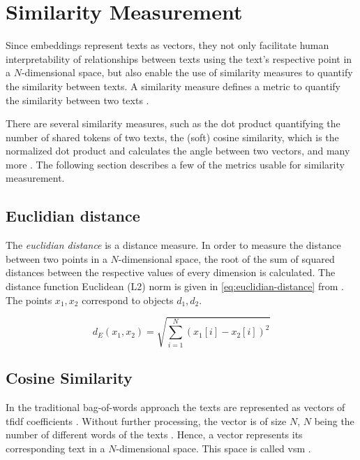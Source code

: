 
\section{Similarity Measurement}\label{sec:similarity-measurement}

Since embeddings represent texts as vectors, they not only facilitate human interpretability of relationships between texts using 
the text's respective point in a $N$-dimensional space, but also enable the use of similarity measures to quantify the similarity between texts.
A similarity measure defines a metric to quantify the similarity between two texts \cite{IR2011, euclidean_l2_norm2015}.

There are several similarity measures, such as the dot product quantifying the number of shared tokens of two texts, 
the (soft) cosine similarity, which is the normalized dot product and calculates the angle between two vectors, and many more \cite{IR2011, euclidean_l2_norm2015}.
The following section describes a few of the metrics usable for similarity measurement.


\subsection{Euclidian distance}\label{subsec:euclidian-distance}

The \textit{euclidian distance} is a distance measure.
In order to measure the distance between two points in a $N$-dimensional space, 
the root of the sum of squared distances between the respective values of every dimension is calculated.
The distance function Euclidean (L2) norm is given in \autoref{eq:euclidian-distance} from \cite{euclidean_l2_norm2015}.
The points $x_1, x_2$ correspond to objects $d_1, d_2$.

\begin{equation}
    d_E(x_1,x_2) = \sqrt{\sum_{i=1}^{N}(x_1\left[ i \right] - x_2\left[ i \right])^2}
    \label{eq:euclidian-distance}
\end{equation}


\subsection{Cosine Similarity}\label{subsec:cosine-similarity}

In the traditional bag-of-words approach the texts are represented as vectors of \ac{tfidf} coefficients \cite{soft_cosine2017}.
Without further processing, the vector is of size $N$, $N$ being the number of different words of the texts \cite{soft_cosine2017}.
Hence, a vector represents its corresponding text in a $N$-dimensional space.
This space is called \ac{vsm} \cite{soft_cosine2014}.

